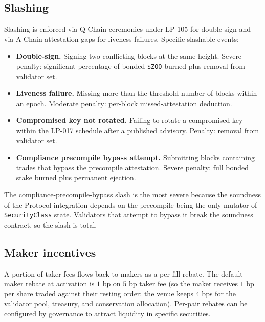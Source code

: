 \subsection{Slashing}

Slashing is enforced via Q-Chain ceremonies under LP-105
\cite{lp-105} for double-sign and via A-Chain attestation gaps for
liveness failures. Specific slashable events:

\begin{itemize}[leftmargin=1.2em]
  \item \textbf{Double-sign.} Signing two conflicting blocks at the
        same height. Severe penalty: significant percentage of
        bonded \texttt{\$ZOO} burned plus removal from validator
        set.
  \item \textbf{Liveness failure.} Missing more than the threshold
        number of blocks within an epoch. Moderate penalty:
        per-block missed-attestation deduction.
  \item \textbf{Compromised key not rotated.} Failing to rotate a
        compromised key within the LP-017 schedule
        \cite{lp-134} after a published advisory. Penalty: removal
        from validator set.
  \item \textbf{Compliance precompile bypass attempt.} Submitting
        blocks containing trades that bypass the \Liquidity{}
        precompile attestation. Severe penalty: full bonded stake
        burned plus permanent ejection.
\end{itemize}

The compliance-precompile-bypass slash is the most severe because
the soundness of the \Liquidity{} Protocol integration
\cite{liquidity-protocol-formal} depends on the precompile being
the only mutator of \texttt{SecurityClass} state. Validators that
attempt to bypass it break the soundness contract, so the slash is
total.

\subsection{Maker incentives}

A portion of taker fees flows back to makers as a per-fill rebate.
The default maker rebate at activation is $1$ bp on $5$ bp taker
fee (so the maker receives $1$ bp per share traded against their
resting order; the venue keeps $4$ bps for the validator pool,
treasury, and conservation allocation). Per-pair rebates can be
configured by \Zoo{} \DAO{} governance to attract liquidity in
specific securities.

